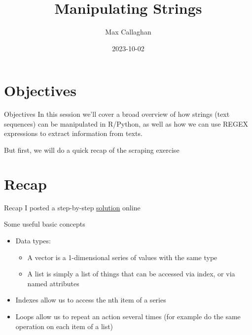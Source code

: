 \documentclass[
  10pt,
  ignorenonframetext,
  aspectratio=169]{beamer}
\title{Manipulating Strings}
\author{Max Callaghan}
\date{2023-10-02}
\providecommand{\tightlist}{%
  \setlength{\itemsep}{0pt}\setlength{\parskip}{0pt}}
\begin{document}
\frame{\titlepage}

\hypertarget{objectives}{%
\section{Objectives}\label{objectives}}

\begin{frame}{Objectives}
\protect\hypertarget{objectives-1}{}
In this session we'll cover a broad overview of how strings (text
sequences) can be manipulated in R/Python, as well as how we can use
REGEX expressions to extract information from texts.

\medskip

But first, we will do a quick recap of the scraping exercise
\end{frame}

\hypertarget{recap}{%
\section{Recap}\label{recap}}

\begin{frame}{Recap}
\protect\hypertarget{recap-1}{}
I posted a step-by-step
\href{https://github.com/mcallaghan/text-as-data/blob/master/Session-3-acquiring-reading/scraping_iea.html}{solution}
online

Some useful basic concepts

\begin{itemize}
\tightlist
\item
  Data types:

  \begin{itemize}
  \tightlist
  \item
    A vector is a 1-dimensional series of values with the same type
  \item
    A list is simply a list of things that can be accessed via index, or
    via named attributes
  \end{itemize}
\item
  Indexes allow us to access the nth item of a series
\item
  Loops allow us to repeat an action several times (for example do the
  same operation on each item of a list)
\end{itemize}
\end{frame}
\end{document}
